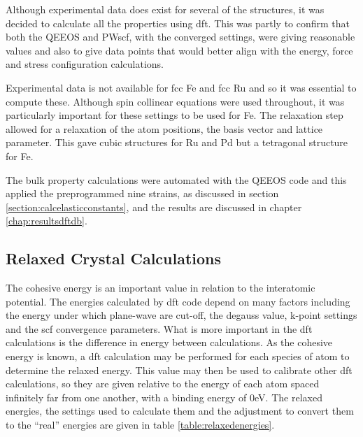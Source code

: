 Although experimental data does exist for several of the structures, it was decided to calculate all the properties using \acrshort{dft}.  This was partly to confirm that both the QEEOS and PWscf, with the converged settings, were giving reasonable values and also to give data points that would better align with the energy, force and stress configuration calculations.

Experimental data is not available for \acrshort{fcc} Fe and \acrshort{fcc} Ru and so it was essential to compute these.  Although spin collinear equations were used throughout, it was particularly important for these settings to be used for Fe.  The relaxation step allowed for a relaxation of the atom positions, the basis vector and lattice parameter.  This gave cubic structures for Ru and Pd but a tetragonal structure for Fe.

The bulk property calculations were automated with the QEEOS code and this applied the preprogrammed nine strains, as discussed in section \ref{section:calcelasticconstants}, and the results are discussed in chapter \ref{chap:resultsdftdb}. 


\subsection{Relaxed Crystal Calculations}

The cohesive energy is an important value in relation to the interatomic potential.  The energies calculated by \acrshort{dft} code depend on many factors including the energy under which plane-wave are cut-off, the degauss value, k-point settings and the \acrshort{scf} convergence parameters.  What is more important in the \acrshort{dft} calculations is the difference in energy between calculations.  As the cohesive energy is known, a \acrshort{dft} calculation may be performed for each species of atom to determine the relaxed energy.  This value may then be used to calibrate other \acrshort{dft} calculations, so they are given relative to the energy of each atom spaced infinitely far from one another, with a binding energy of 0eV.  The relaxed energies, the settings used to calculate them and the adjustment to convert them to the \enquote{real} energies are given in table \ref{table:relaxedenergies}.

